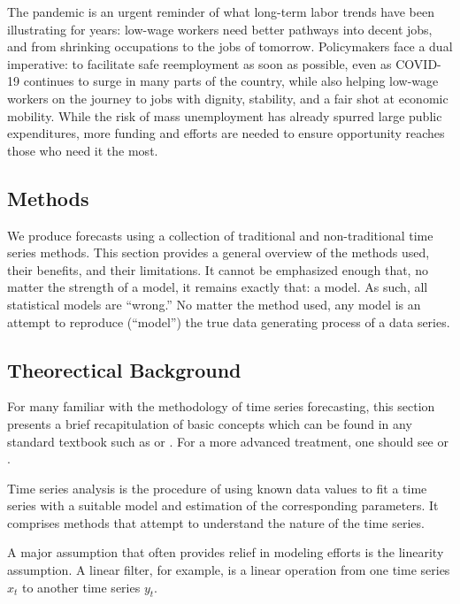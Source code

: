 \documentclass[
  11pt,
]{article}
\begin{document}
The pandemic is an urgent reminder of what long-term labor trends have
been illustrating for years: low-wage workers need better pathways into
decent jobs, and from shrinking occupations to the jobs of tomorrow.
Policymakers face a dual imperative: to facilitate safe reemployment as
soon as possible, even as COVID-19 continues to surge in many parts of
the country, while also helping low-wage workers on the journey to jobs
with dignity, stability, and a fair shot at economic mobility. While the
risk of mass unemployment has already spurred large public expenditures,
more funding and efforts are needed to ensure opportunity reaches those
who need it the most.

\hypertarget{methods}{%
\subsection{Methods}\label{methods}}

We produce forecasts using a collection of traditional and
non-traditional time series methods. This section provides a general
overview of the methods used, their benefits, and their limitations. It
cannot be emphasized enough that, no matter the strength of a model, it
remains exactly that: a model. As such, all statistical models are
``wrong.'' No matter the method used, any model is an attempt to
reproduce (``model'') the true data generating process of a data series.

\hypertarget{theorectical-background}{%
\subsection{Theorectical Background}\label{theorectical-background}}

For many familiar with the methodology of time series forecasting, this
section presents a brief recapitulation of basic concepts which can be
found in any standard textbook such as \cite{MJK} or \cite{brockwell02}.
For a more advanced treatment, one should see \cite{hamilton94} or
\cite{brockwell06}.

Time series analysis is the procedure of using known data values to fit
a time series with a suitable model and estimation of the corresponding
parameters. It comprises methods that attempt to understand the nature
of the time series.

A major assumption that often provides relief in modeling efforts is the
linearity assumption. A linear filter, for example, is a linear
operation from one time series \(x_{t}\) to another time series
\(y_{t}\).
\end{document}
